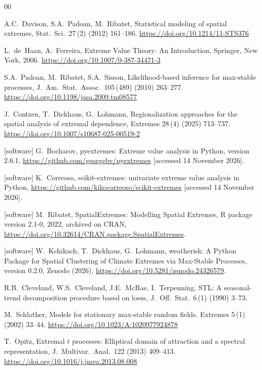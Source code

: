 \documentclass[preprint,12pt,a4paper]{elsarticle}
\begin{document}
\begin{thebibliography}{00}

A.C.~Davison, S.A.~Padoan, M.~Ribatet,
Statistical modeling of spatial extremes,
Stat.\ Sci.\ 27\,(2) (2012) 161--186.
\url{https://doi.org/10.1214/11-STS376}

L.~de~Haan, A.~Ferreira,
Extreme Value Theory: An Introduction,
Springer, New York, 2006.
\url{https://doi.org/10.1007/0-387-34471-3}

S.A.~Padoan, M.~Ribatet, S.A.~Sisson,
Likelihood-based inference for max-stable processes,
J.\ Am.\ Stat.\ Assoc.\ 105\,(489) (2010) 263--277.
\url{https://doi.org/10.1198/jasa.2009.tm08577}

J.~Contzen, T.~Dickhaus, G.~Lohmann,
Regionalization approaches for the spatial analysis of extremal
dependence,
Extremes 28\,(4) (2025) 713--737.
\url{https://doi.org/10.1007/s10687-025-00519-2}

[software] G.~Bocharov,
pyextremes: Extreme value analysis in Python, version 2.6.1,
\url{https://github.com/georgebv/pyextremes} [accessed 14
November 2026].

[software] K.~Correoso,
scikit-extremes: univariate extreme value analysis in Python,
\url{https://github.com/kikocorreoso/scikit-extremes}
[accessed 14 November 2026].

[software] M.~Ribatet,
SpatialExtremes: Modelling Spatial Extremes,
R package version 2.1-0, 2022, archived on CRAN,
\url{https://doi.org/10.32614/CRAN.package.SpatialExtremes}.

[software] W.~Kchikach, T.~Dickhaus, G.~Lohmann,
weatherisk: A Python Package for Spatial Clustering of Climate
Extremes via Max-Stable Processes, version 0.2.0, Zenodo (2026),
\url{https://doi.org/10.5281/zenodo.24326579}.

R.B.~Cleveland, W.S.~Cleveland, J.E.~McRae, I.~Terpenning,
STL: A seasonal-trend decomposition procedure based on loess,
J.\ Off.\ Stat.\ 6\,(1) (1990) 3--73.

M.~Schlather,
Models for stationary max-stable random fields,
Extremes 5\,(1) (2002) 33--44.
\url{https://doi.org/10.1023/A:1020977924878}

T.~Opitz,
Extremal $t$ processes: Elliptical domain of attraction and a
spectral representation,
J.\ Multivar.\ Anal.\ 122 (2013) 409--413.
\url{https://doi.org/10.1016/j.jmva.2013.08.008}


\end{thebibliography}
\end{document}
